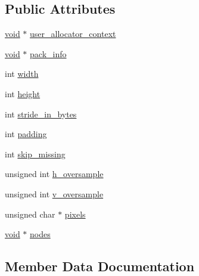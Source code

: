 \subsection*{Public Attributes}
\begin{DoxyCompactItemize}
\item 
\hyperlink{imgui__impl__opengl3__loader_8h_ac668e7cffd9e2e9cfee428b9b2f34fa7}{void} $\ast$ \hyperlink{structstbtt__pack__context_a45fddc4d4adfcef58aa08ad2874cedc0}{user\+\_\+allocator\+\_\+context}
\item 
\hyperlink{imgui__impl__opengl3__loader_8h_ac668e7cffd9e2e9cfee428b9b2f34fa7}{void} $\ast$ \hyperlink{structstbtt__pack__context_a303a72f0a39479b439fa531925be7031}{pack\+\_\+info}
\item 
int \hyperlink{structstbtt__pack__context_a5da0b7b5d3b82d5fc75ea1c8945183fa}{width}
\item 
int \hyperlink{structstbtt__pack__context_a817ec010d7f09ba9776517c5a87f13a7}{height}
\item 
int \hyperlink{structstbtt__pack__context_abbe9a25aae0e26b81a5f7339fac23801}{stride\+\_\+in\+\_\+bytes}
\item 
int \hyperlink{structstbtt__pack__context_a1191f34fa995910044191584f0d7a803}{padding}
\item 
int \hyperlink{structstbtt__pack__context_a435bae89225862e65211e0b456f632d3}{skip\+\_\+missing}
\item 
unsigned int \hyperlink{structstbtt__pack__context_aee1019f9634cad49fa07e8e1f897d6b7}{h\+\_\+oversample}
\item 
unsigned int \hyperlink{structstbtt__pack__context_a4b55efa27ef36e7f258afe92921784c0}{v\+\_\+oversample}
\item 
unsigned char $\ast$ \hyperlink{structstbtt__pack__context_a6549105fd1922df983fbe036b9db4a1a}{pixels}
\item 
\hyperlink{imgui__impl__opengl3__loader_8h_ac668e7cffd9e2e9cfee428b9b2f34fa7}{void} $\ast$ \hyperlink{structstbtt__pack__context_a11a73fa6860e6be1ac039fcca9db2c7c}{nodes}
\end{DoxyCompactItemize}


\subsection{Member Data Documentation}
\mbox{\label{structstbtt__pack__context_aee1019f9634cad49fa07e8e1f897d6b7}} 
